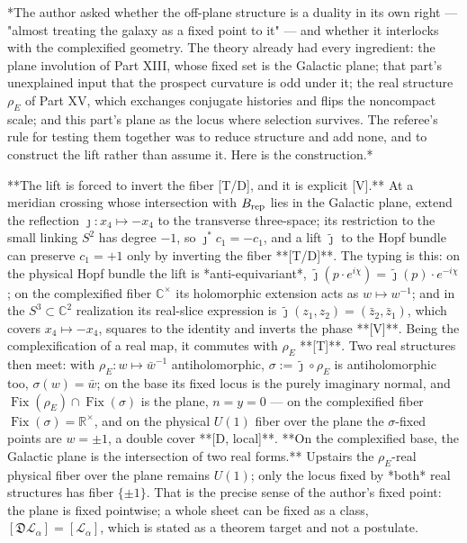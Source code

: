 *The author asked whether the off-plane structure is a duality in its own right — "almost treating the galaxy as a fixed point to it" — and whether it interlocks with the complexified geometry. The theory already had every ingredient: the plane involution of Part XIII, whose fixed set is the Galactic plane; that part's unexplained input that the prospect curvature is odd under it; the real structure $\rho_E$ of Part XV, which exchanges conjugate histories and flips the noncompact scale; and this part's plane as the locus where selection survives. The referee's rule for testing them together was to reduce structure and add none, and to construct the lift rather than assume it. Here is the construction.*

**The lift is forced to invert the fiber [T/D], and it is explicit [V].** At a meridian crossing whose intersection with $B_{\rm rep}$ lies in the Galactic plane, extend the reflection $\jmath:x_4\mapsto-x_4$ to the transverse three-space; its restriction to the small linking $S^2$ has degree $-1$, so $\jmath^*c_1 = -c_1$, and a lift $\widetilde\jmath$ to the Hopf bundle can preserve $c_1 = +1$ only by inverting the fiber **[T/D]**. The typing is this: on the physical Hopf bundle the lift is *anti-equivariant*, $\widetilde\jmath(p\cdot e^{i\chi}) = \widetilde\jmath(p)\cdot e^{-i\chi}$; on the complexified fiber $\mathbb C^\times$ its holomorphic extension acts as $w\mapsto w^{-1}$; and in the $S^3\subset\mathbb C^2$ realization its real-slice expression is $\widetilde\jmath(z_1,z_2) = (\bar z_2,\bar z_1)$, which covers $x_4\mapsto-x_4$, squares to the identity and inverts the phase **[V]**. Being the complexification of a real map, it commutes with $\rho_E$ **[T]**. Two real structures then meet: with $\rho_E:w\mapsto\bar w^{-1}$ antiholomorphic, $\sigma := \widetilde\jmath\circ\rho_E$ is antiholomorphic too, $\sigma(w) = \bar w$; on the base its fixed locus is the purely imaginary normal, and $\operatorname{Fix}(\rho_E)\cap\operatorname{Fix}(\sigma)$ is the plane, $n = y = 0$ — on the complexified fiber $\operatorname{Fix}(\sigma) = \mathbb R^\times$, and on the physical $U(1)$ fiber over the plane the $\sigma$-fixed points are $w = \pm1$, a double cover **[D, local]**. **On the complexified base, the Galactic plane is the intersection of two real forms.** Upstairs the $\rho_E$-real physical fiber over the plane remains $U(1)$; only the locus fixed by *both* real structures has fiber $\{\pm1\}$. That is the precise sense of the author's fixed point: the plane is fixed pointwise; a whole sheet can be fixed as a class, $[\mathfrak D\mathscr L_\alpha] = [\mathscr L_\alpha]$, which is stated as a theorem target and not a postulate.

